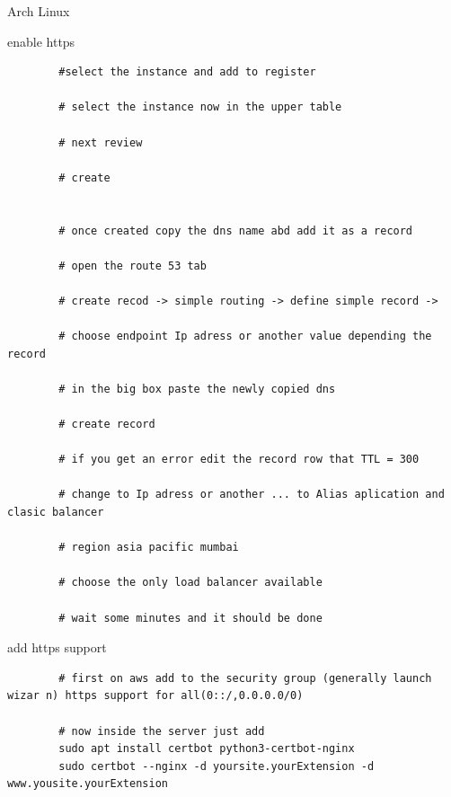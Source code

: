 \begin{section}{Arch Linux}
\begin{subsection}{enable https}
\begin{verbatim}
		#select the instance and add to register

		# select the instance now in the upper table

		# next review

		# create


		# once created copy the dns name abd add it as a record

		# open the route 53 tab

		# create recod -> simple routing -> define simple record -> 

		# choose endpoint Ip adress or another value depending the record

		# in the big box paste the newly copied dns

		# create record

		# if you get an error edit the record row that TTL = 300

		# change to Ip adress or another ... to Alias aplication and clasic balancer

		# region asia pacific mumbai

		# choose the only load balancer available 

		# wait some minutes and it should be done

	\end{verbatim}
\end{subsection}

\begin{subsection}{add https support}
	\begin{verbatim}
		# first on aws add to the security group (generally launch wizar n) https support for all(0::/,0.0.0.0/0)

		# now inside the server just add
		sudo apt install certbot python3-certbot-nginx
		sudo certbot --nginx -d yoursite.yourExtension -d www.yousite.yourExtension
	\end{verbatim}


\end{subsection}

\end{section}


